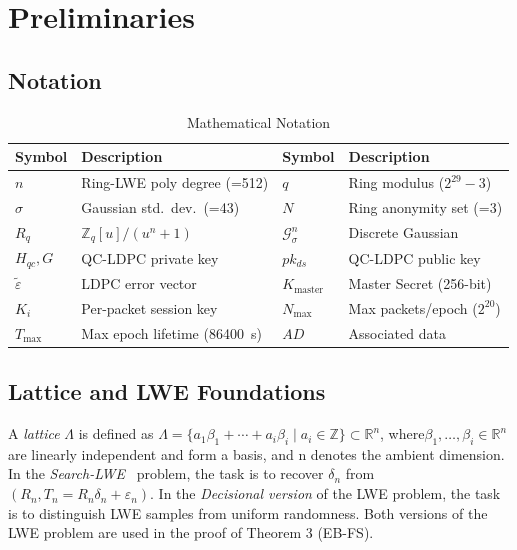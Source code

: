 \documentclass[conference]{IEEEtran}
\newcommand{\Kmaster}{K_{\mathrm{master}}}
\newcommand{\Nmax}{N_{\max}}
\newcommand{\Tmax}{T_{\max}}
\begin{document}
\section{Preliminaries}
\label{sec:prelim}

\subsection{Notation}

\begin{table}[!t]
\centering
\caption{Mathematical Notation}
\label{tab:notation}
\begin{tabular}{ll|ll}
\toprule
\textbf{Symbol} & \textbf{Description} & \textbf{Symbol} & \textbf{Description} \\
\midrule
$n$ & Ring-LWE poly degree (=512) & $q$ & Ring modulus ($2^{29}-3$) \\
$\sigma$ & Gaussian std.\ dev.\ (=43) & $N$ & Ring anonymity set (=3) \\
$R_q$ & $\mathbb{Z}_q[u]/(u^n+1)$ & $\mathcal{G}^n_\sigma$ & Discrete Gaussian \\
$H_{qc}, G$ & QC-LDPC private key & $pk_{ds}$ & QC-LDPC public key \\
$\tilde{\varepsilon}$ & LDPC error vector & $\Kmaster$ & Master Secret (256-bit) \\
$K_i$ & Per-packet session key & $\Nmax$ & Max packets/epoch ($2^{20}$) \\
$\Tmax$ & Max epoch lifetime (86400~s) & $AD$ & Associated data \\
\bottomrule
\end{tabular}
\end{table}

\subsection{Lattice and LWE Foundations}

A \emph{lattice} $\Lambda$ is defined as
$\Lambda = \{ a_1\beta_1 + \cdots + a_i\beta_i \mid a_i \in \mathbb{Z} \} \subset \mathbb{R}^n$,
where$\beta_1,\ldots,\beta_i \in \mathbb{R}^n$ are linearly independent and form a basis, and n denotes the ambient dimension. In the \emph{Search-LWE}~\cite{regev2009} problem, the task is to recover $\delta_n$ from $(R_n, T_n = R_n\delta_n + \varepsilon_n)$. In the \emph{Decisional version} of the LWE problem, the task is to distinguish LWE samples from uniform randomness. Both versions of the LWE problem are used in the proof of Theorem 3 (EB-FS).
\end{document}
